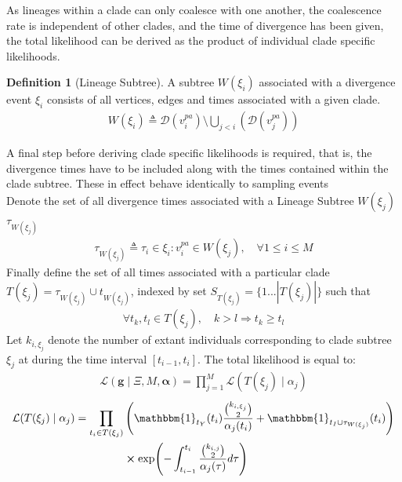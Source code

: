 \documentclass{ieeeaccess}
\theoremstyle{definition}
\newtheorem{definition}{Definition}[section]
\begin{document}
As lineages within a clade can only coalesce with one another, the coalescence rate is independent of other clades, and the time of divergence has been given, the total likelihood can be derived as the product of individual clade specific likelihoods.
\begin{definition}[Lineage Subtree]
A subtree $W(\xi_i)$ associated with a divergence event $\xi_i$ consists of all vertices, edges and times associated with a given clade.
\begin{gather}
W(\xi_i) \triangleq \mathcal{D}(v^{pa}_i) \setminus \bigcup_{j<i}(\mathcal{D}(v^{pa}_j))
\end{gather} 
\end{definition}
A final step before deriving clade specific likelihoods is required, that is, the divergence times have to be included along with the times contained within the clade subtree. These in effect behave identically to sampling events\\

Denote the set of all divergence times associated with a Lineage Subtree $W(\xi_j)$ $\tau_{W(\xi_j)}$
\begin{gather*}
\tau_{W(\xi_j)} \triangleq \tau_i \in \xi_i : v^{pa}_i \in W(\xi_j), \quad \forall 1\leq i\leq M
\end{gather*}
Finally define the set of all times associated with a particular clade
$T(\xi_j) = \tau_{W(\xi_j)}\cup t_{W(\xi_j)}$, indexed by set $S_{T(\xi_j)}=\{1 ... |T(\xi_j)|\}$ such that
\begin{gather*}
\forall t_k, t_l \in T(\xi_j),\quad k>l \Rightarrow t_k \geq t_l
\end{gather*}
Let $k_{i,\xi_j}$ denote the number of extant individuals corresponding to clade subtree  $\xi_j$ at during the time interval $[t_{i-1}, t_i]$.
The total likelihood is equal to:
\begin{gather}
\mathcal{L}(\mathbf{g}\mid \Xi, M, \mathbf{\alpha}) = \prod_{j=1}^{M}\mathcal{L}(T(\xi_j) \mid \alpha_j) 
\end{gather}
\begin{gather}
\begin{aligned}
\mathcal{L}(T(\xi_j) \mid \alpha_j) = \prod_{t_i\in T(\xi_j)}&\left(\mathbbm{1}_{t_Y}(t_i) \frac{\binom{k_{i,\xi_j}}{2}}{\alpha_j(t_i)}+\mathbbm{1}_{t_I\cup\tau_{W(\xi_j)}}(t_i)\right)\\
&\cross\exp(-\int_{t_{i-1}}^{t_i}\frac{\binom{k_{i,j}}{2}}{\alpha_j(\tau)}d\tau)
\end{aligned}
\end{gather}
\end{document}
